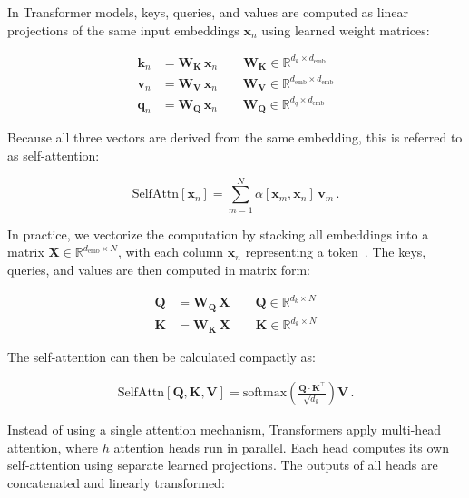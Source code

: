 In Transformer models, keys, queries, and values are computed as linear projections of the same input embeddings $\mathbf{x}_n$ using learned weight matrices:

\begin{align}
\label{eq:attn_keys}
	\mathbf{k}_n & = \mathbf{W_K} \, \mathbf{x}_n \qquad \mathbf{W_K} \in \mathbb{R}^{d_k \times d_{\mathrm{emb}}} \\
\label{eq:attn_values}
	\mathbf{v}_n & = \mathbf{W_V} \, \mathbf{x}_n \qquad \mathbf{W_V} \in \mathbb{R}^{d_{\mathrm{emb}} \times d_{\mathrm{emb}}} \\
\label{eq:attn_queries}
	\mathbf{q}_n & = \mathbf{W_Q} \, \mathbf{x}_n \qquad \mathbf{W_Q} \in \mathbb{R}^{d_q \times d_{\mathrm{emb}}} 
\end{align}

Because all three vectors are derived from the same embedding, this is referred to as self-attention:


\begin{equation}
\label{eq:self_attention}
	\mathrm{SelfAttn}[\mathbf{x}_n] = \sum_{m=1}^N \alpha \left[ \mathbf{x}_m, \mathbf{x}_n \right] \, \mathbf{v}_m \,.
\end{equation}

In practice, we vectorize the computation by stacking all embeddings into a matrix $\mathbf{X} \in \mathbb{R}^{d_{\mathrm{emb}} \times N}$, with each column $\mathbf{x}_n$ representing a token~\cite{zhang_dive_2023, prince_understanding_2023}. The keys, queries, and values are then computed in matrix form: 

\begin{align}
\label{eq:attn_queries_matrix}
	\mathbf{Q} & = \mathbf{W_Q} \, \mathbf{X} \qquad \mathbf{Q} \in \mathbb{R}^{d_k \times N} \\
\label{eq:attn_keys_matrix}
	\mathbf{K} & = \mathbf{W_K} \, \mathbf{X} \qquad \mathbf{K} \in \mathbb{R}^{d_k \times N} 
\end{align}

The self-attention can then be calculated compactly as:

\begin{align}
\label{eq:self_attn_matrix}
	\mathrm{SelfAttn}[\mathbf{Q}, \mathbf{K}, \mathbf{V}] =  \mathrm{softmax} \left( \frac{\mathbf{Q} \cdot \mathbf{K}^{\intercal}}{\sqrt{d_k} } \right) \mathbf{V} \,.
\end{align}

Instead of using a single attention mechanism, Transformers apply multi-head attention, where $h$ attention heads run in parallel. Each head computes its own self-attention using separate learned projections. The outputs of all heads are concatenated and linearly transformed:

